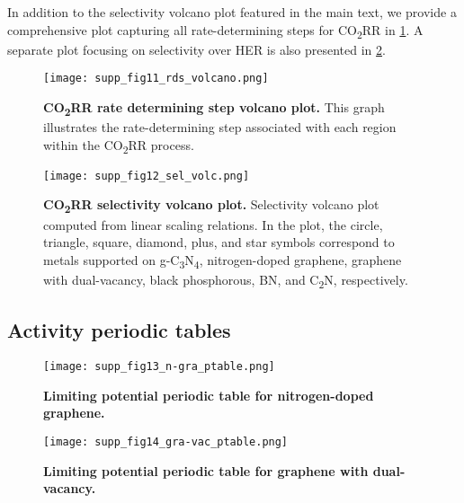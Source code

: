 In addition to the selectivity volcano plot featured in the main text, we provide a comprehensive plot capturing all rate-determining steps for CO\textsubscript{2}RR in \cref{supp_fig11:rds_volcano}. A separate plot focusing on selectivity over HER is also presented in \cref{supp_fig12:sel_volc}.

\begin{figure}[htbp]
  \centering
  \texttt{[image: supp\_fig11\_rds\_volcano.png]}
  \caption{\textbf{CO\textsubscript{2}RR rate determining step volcano plot.}
  This graph illustrates the rate-determining step associated with each region within the CO\textsubscript{2}RR process.}
  \label{supp_fig11:rds_volcano}
\end{figure}

\begin{figure}[htbp]
  \centering
  \texttt{[image: supp\_fig12\_sel\_volc.png]}
  \caption{\textbf{CO\textsubscript{2}RR selectivity volcano plot.}
  Selectivity volcano plot computed from linear scaling relations.
  In the plot, the circle, triangle, square, diamond, plus, and star symbols correspond to
  metals supported on g-C\textsubscript{3}N\textsubscript{4}, nitrogen-doped graphene, graphene with dual-vacancy,
  black phosphorous, BN, and C\textsubscript{2}N, respectively.}
  \label{supp_fig12:sel_volc}
\end{figure}

\subsection{Activity periodic tables}
\label{supp_sec2.7_ptable}

\begin{figure}[htbp]
  \centering
  \texttt{[image: supp\_fig13\_n-gra\_ptable.png]}
  \caption{\textbf{Limiting potential periodic table for nitrogen-doped graphene.}}
  \label{supp_fig13:n-gra_ptable}
\end{figure}

\begin{figure}[htbp]
  \centering
  \texttt{[image: supp\_fig14\_gra-vac\_ptable.png]}
  \caption{\textbf{Limiting potential periodic table for graphene with dual-vacancy.}}
  \label{supp_fig14:gra-vac_ptable}
\end{figure}

